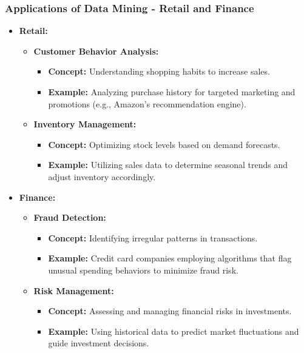 \documentclass{beamer}
\begin{document}
\begin{frame}[fragile]
    \frametitle{Applications of Data Mining - Retail and Finance}
    \begin{itemize}
        \item \textbf{Retail:}
            \begin{itemize}
                \item \textbf{Customer Behavior Analysis:}
                    \begin{itemize}
                        \item \textbf{Concept:} Understanding shopping habits to increase sales.
                        \item \textbf{Example:} Analyzing purchase history for targeted marketing and promotions (e.g., Amazon’s recommendation engine).
                    \end{itemize}
                \item \textbf{Inventory Management:}
                    \begin{itemize}
                        \item \textbf{Concept:} Optimizing stock levels based on demand forecasts.
                        \item \textbf{Example:} Utilizing sales data to determine seasonal trends and adjust inventory accordingly.
                    \end{itemize}
            \end{itemize}
        \item \textbf{Finance:}
            \begin{itemize}
                \item \textbf{Fraud Detection:}
                    \begin{itemize}
                        \item \textbf{Concept:} Identifying irregular patterns in transactions.
                        \item \textbf{Example:} Credit card companies employing algorithms that flag unusual spending behaviors to minimize fraud risk.
                    \end{itemize}
                \item \textbf{Risk Management:}
                    \begin{itemize}
                        \item \textbf{Concept:} Assessing and managing financial risks in investments.
                        \item \textbf{Example:} Using historical data to predict market fluctuations and guide investment decisions.
                    \end{itemize}
            \end{itemize}
    \end{itemize}
\end{frame}
\end{document}

